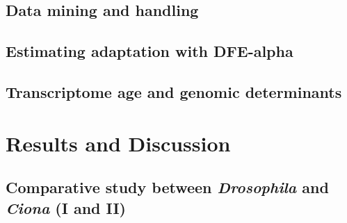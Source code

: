 \documentclass[officiallayout]{tktla_modified}
\begin{document}
	\section{Data mining and handling}
	

	\section{Estimating adaptation with DFE-alpha}
	

	\section{Transcriptome age and genomic determinants}
	

%
\clearpage

	
\chapter{Results and Discussion}

%	
%	

%	

\section{Comparative study between \textit{Drosophila} and \textit{Ciona} (I and II)}
	

%	
\end{document}
